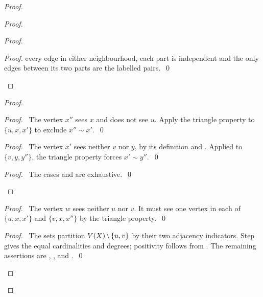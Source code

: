 \begin{proof}
\begin{proof}
\begin{proof}
\begin{proof}
    every edge in either neighbourhood, each part is independent and the only edges
    between its two parts are the labelled pairs.~\qed
   \end{proof}
  \end{proof}
  \begin{proof}
   \begin{proof}
    \pf\ The vertex $x''$ sees $x$ and does not see $u$. Apply the triangle property to
    $\{u,x,x'\}$ to exclude $x''\sim x'$.~\qed
   \end{proof}
   \begin{proof}
    \pf\ The vertex $x'$ sees neither $v$ nor $y$, by its definition and
    . Applied to $\{v,y,y''\}$, the triangle property forces
    $x'\sim y''$.~\qed
   \end{proof}
   \qedstep
   \begin{proof}\pf\ The cases  and  are exhaustive.~\qed\end{proof}
  \end{proof}
  \begin{proof}
   \pf\ The vertex $w$ sees neither $u$ nor $v$. It must see one vertex in each
   of $\{u,x,x'\}$ and $\{v,x,x''\}$ by the triangle property.~\qed
  \end{proof}
  \qedstep
  \begin{proof}
   \pf\ The sets partition $V(X)\mathbin{\mkern-1.5mu\setminus\mkern-1.5mu}\{u,v\}$ by their two adjacency indicators.
   Step  gives the equal cardinalities and degrees; positivity follows
   from . The remaining assertions are
   , , and .~\qed
  \end{proof}
 \end{proof}


\end{proof}
